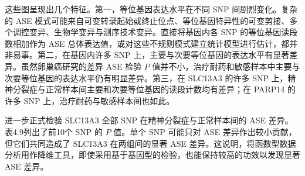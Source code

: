 这些图呈现出几个特征。第一，等位基因表达水平在不同 SNP 间剧烈变化。复杂的 ASE 模式可能来自可变转录起始或终止位点、等位基因特异性的可变剪接、多个调控变异、生物学变异与测序技术变异。直接将基因内各 SNP 的等位基因读段数相加作为 ASE 总体表达值，或对这些不规则模式建立统计模型进行估计，都并非易事。第二，在基因内许多 SNP 上，主要与次要等位基因的表达水平有显著差异。虽然卵巢癌研究的差异 ASE 检验 $P$ 值并不小，治疗耐药和敏感样本中主要与次要等位基因的表达水平仍有明显差异。第三，在 SLC13A3 的许多 SNP 上，精神分裂症与正常样本间主要和次要等位基因的读段计数均有差异；在 PARP14 的许多 SNP 上，治疗耐药与敏感样本间也如此。

进一步正式检验 SLC13A3 全部 SNP 在精神分裂症与正常样本间的 ASE 差异。表4.9列出了前10个 SNP 的 $P$ 值。单个 SNP 可能只对 ASE 差异作出较小贡献，但它们共同造成了 SLC13A3 在两组间的显著 ASE 差异。这说明，将函数型数据分析用作降维工具，即使采用基于基因型的检验，也能保持较高的功效以发现显著 ASE 差异。

\FloatBarrier

